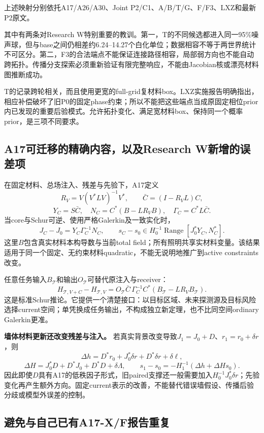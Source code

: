 上述映射分别依托A17/A26/A30、Joint P2/C1、A/B/T/G、F/F3、LXZ和最新P2原文。\cite{R_A17,R_A26,R_A30,R_B1,R_C1,R_A,R_B,R_T,R_G,R_F,R_F3,R_LXZ,R_A17X,R_P2}

其中有两条对Research W特别重要的教训。第一，T的不同候选都进入同一95\%噪声球，但与base之间仍相差约6.24--14.27个白化单位；数据相容不等于两世界统计不可区分。第二，F3的合法端点不能保证连接路径相容，局部弱方向也不能自动跨拓扑。传播分支探索必须重新验证有限完整响应，不能由Jacobian核或漂亮材料图推断成功。\cite{R_T,R_F3}

T的记录跨轮相关，而且使用更宽的full-grid复材料box。LXZ实施报告明确指出，相应补偿破坏了旧P0的固定phase约束；所以不能把这些端点当成原固定相位prior内已发现的重要后验模式。允许拓扑变化、满足宽材料box、保持同一个概率prior，是三项不同要求。\cite{R_T,R_LXZ}

\subsection{A17可迁移的精确内容，以及Research W新增的误差项}

在固定材料、总场注入、残差与先验下，A17定义
\[
R_V=V(V^*LV)^{-1}V^*,\qquad
\bar C=(I-R_VL)C,
\]
\[
Y_C=S\bar C,\quad
N_C=C^*(B-LR_VB),\quad
\Gamma_C=C^*L\bar C.
\]
当core与Schur可逆、使用严格Galerkin及一致实化时，
\[
J_C-J_0=Y_C\Gamma_C^{-1}N_C,\qquad
s_C-s_0\in H_0^{-1}\operatorname{Range}[J_0^*Y_C,N_C^*].
\]
这里\(B\)包含真实材料本构导数与当前total field；所有照明共享实材料变量。该结果适用于同一个固定、无约束材料quadratic，不能无说明地推广到active constraints改变。\cite{R_A17core}

任意任务输入\(B_{\mathcal T}\)和输出\(O_{\mathcal T}\)可替代原注入与receiver：
\[
H_{\mathcal T,V+C}-H_{\mathcal T,V}
=
O_{\mathcal T}\bar C\,\Gamma_C^{-1}
C^*(B_{\mathcal T}-LR_VB_{\mathcal T}).
\]
这是标准Schur推论。它提供一个清楚接口：以目标区域、未来探测源及目标风险选择current空间；单凭换成任务输出，不构成独立新定理，也不比同空间ordinary Galerkin更准。

\textbf{墙体材料更新还改变残差与注入。}
若真实背景改变导致\(J_1=J_0+D\)、\(r_1=r_0+\delta r\)，则
\[
\Delta h
=D^*r_0+J_0^*\delta r+D^*\delta r+\delta\ell,
\]
\[
\Delta H=J_0^*D+D^*J_0+D^*D+\delta\Lambda,\qquad
s_1-s_0=-H_1^{-1}(\Delta h+\Delta Hs_0).
\]
因此即使\(D\)具有A17的低秩因子形式，旧paired支撑还一般需要加入\(H_0^{-1}J_0^*\delta r\)；先验变化再产生额外方向。固定current表示的改善，不能替代错误墙假设、传播后验分歧或模型外误差的控制。

\subsection{避免与自己已有A17-X/F报告重复}

